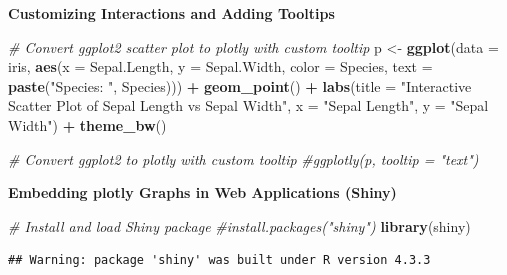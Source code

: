 \documentclass[
]{book}
\newenvironment{Shaded}{\begin{snugshade}}{\end{snugshade}}
\newcommand{\AttributeTok}[1]{\textcolor[rgb]{0.13,0.29,0.53}{#1}}
\newcommand{\CommentTok}[1]{\textcolor[rgb]{0.56,0.35,0.01}{\textit{#1}}}
\newcommand{\FunctionTok}[1]{\textcolor[rgb]{0.13,0.29,0.53}{\textbf{#1}}}
\newcommand{\NormalTok}[1]{#1}
\newcommand{\OtherTok}[1]{\textcolor[rgb]{0.56,0.35,0.01}{#1}}
\newcommand{\SpecialCharTok}[1]{\textcolor[rgb]{0.81,0.36,0.00}{\textbf{#1}}}
\newcommand{\StringTok}[1]{\textcolor[rgb]{0.31,0.60,0.02}{#1}}
\begin{document}
\textbf{Customizing Interactions and Adding Tooltips}

\begin{Shaded}
\begin{Highlighting}[]
\CommentTok{\# Convert ggplot2 scatter plot to plotly with custom tooltip}
\NormalTok{p }\OtherTok{\textless{}{-}} \FunctionTok{ggplot}\NormalTok{(}\AttributeTok{data =}\NormalTok{ iris, }\FunctionTok{aes}\NormalTok{(}\AttributeTok{x =}\NormalTok{ Sepal.Length, }\AttributeTok{y =}\NormalTok{ Sepal.Width, }\AttributeTok{color =}\NormalTok{ Species, }
                             \AttributeTok{text =} \FunctionTok{paste}\NormalTok{(}\StringTok{"Species: "}\NormalTok{, Species))) }\SpecialCharTok{+} 
  \FunctionTok{geom\_point}\NormalTok{() }\SpecialCharTok{+}
  \FunctionTok{labs}\NormalTok{(}\AttributeTok{title =} \StringTok{"Interactive Scatter Plot of Sepal Length vs Sepal Width"}\NormalTok{,}
       \AttributeTok{x =} \StringTok{"Sepal Length"}\NormalTok{, }\AttributeTok{y =} \StringTok{"Sepal Width"}\NormalTok{) }\SpecialCharTok{+}
  \FunctionTok{theme\_bw}\NormalTok{()}

\CommentTok{\# Convert ggplot2 to plotly with custom tooltip}
\CommentTok{\#ggplotly(p, tooltip = "text")}
\end{Highlighting}
\end{Shaded}

\textbf{Embedding plotly Graphs in Web Applications (Shiny)}

\begin{Shaded}
\begin{Highlighting}[]
\CommentTok{\# Install and load Shiny package}
\CommentTok{\#install.packages("shiny")}
\FunctionTok{library}\NormalTok{(shiny)}
\end{Highlighting}
\end{Shaded}

\begin{verbatim}
## Warning: package 'shiny' was built under R version 4.3.3
\end{verbatim}
\end{document}
